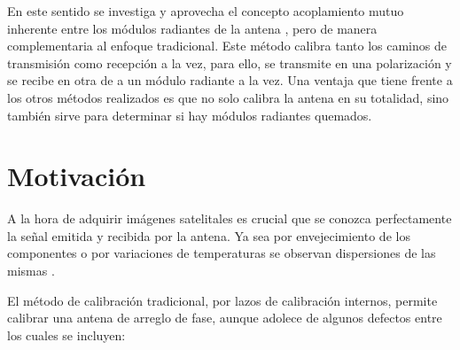 En este sentido se investiga y aprovecha el concepto acoplamiento mutuo inherente entre los módulos radiantes de la antena 
\cite{Aumann1989}, pero de manera complementaria al enfoque tradicional. Este método calibra tanto los caminos de transmisión
como recepción a la vez, para ello, se transmite en una polarización y se recibe en otra de a un módulo radiante a la vez. 
Una ventaja que tiene frente a los otros métodos realizados es que no solo calibra la antena en su totalidad, sino también 
sirve para determinar si hay módulos radiantes quemados.

\begin{comment}
\todo[inline]{pablo, la parte que está debajo del comentario la dejo??? la saco?? donde la pongo}
En esta tesis se realizarán las siguientes tareas:

\begin{enumerate}
    \item Se explicarán las ventajas y desventajas del método propuesto respecto del tradicional.
    \item Se analizarán y propondorán los requerimientos para poder implementarlo.
    \item Se desarrollará un modelo de antena de arreglo de fase polarimétrico 
			básico representativo en parámetros S \cite{Caspers}.
    \item Se añadirán al mismo parámetros de dispersión de comportamiento que 
			permitan analizar su comportamiento.
    \item Se realizará un modelo de calibración que será implementado algoritimicamente.
\end{enumerate}
\end{comment}


\section{Motivación}

A la hora de adquirir imágenes satelitales es crucial que se conozca perfectamente la señal emitida y recibida por la antena. 
Ya sea por envejecimiento de los componentes \cite{Agrawal2003} o por variaciones de temperaturas se observan dispersiones de 
las mismas \cite{Keizer2011}. 

El método de calibración tradicional, por lazos de calibración internos, permite calibrar una antena de arreglo de fase, aunque 
adolece de algunos defectos entre los cuales se incluyen:

